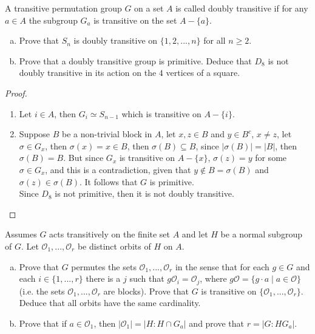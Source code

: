 \documentclass{article}
\newcommand{\orbit}{\mathcal{O}}
\newenvironment{problem}[2][Problem]{\begin{trivlist}
\item[\hskip \labelsep {\bfseries #1}\hskip \labelsep {\bfseries #2.}]}{\end{trivlist}}
\begin{document}
\begin{problem}{8}
     A transitive permutation group $G$ on a set $A$ is called doubly transitive if for any $a \in A$ the subgroup $G_a$ is transitive on the set $A-\{a\}$.
     \begin{enumerate}[(a)]
         \item Prove that $S_n$ is doubly transitive on $\{1, 2, ..., n\}$ for all $n \geq 2$. 
         \item Prove that a doubly transitive group is primitive. Deduce that $D_8$ is not doubly transitive in its action on the $4$ vertices of a square.
     \end{enumerate}
\end{problem}
\begin{proof}
\begin{enumerate}
    \item Let $i\in A$, then $G_i \simeq S_{n-1}$ which is transitive on $A-\{i\}$.
    \item Suppose $B$ be a non-trivial block in $A$, let $x, z\in B$ and $y \in B^c$, $x \neq z$, let $\sigma \in G_x$, then $\sigma(x)=x\in B$, then $\sigma(B)\subseteq B$, since $|\sigma (B)|=|B|$, then $\sigma(B)=B$. But since $G_x$ is transitive on $A-\{x\}$, $\sigma(z)=y$ for some $\sigma \in G_x$, and this is a contradiction, given that 
    $y \notin B=\sigma(B)$ and $\sigma(z) \in \sigma(B)$. It follows that $G$ is primitive.\\
    Since $D_8$ is not primitive, then it is not doubly transitive.
\end{enumerate}
\end{proof}
\begin{problem}{9}
    Assumes $G$ acts transitively on the finite set $A$ and let $H$ be a normal subgroup of $G$. Let $\orbit_1, ..., \orbit_r$ be distinct orbits of $H$ on $A$.
    \begin{enumerate}[(a)]
        \item Prove that $G$ permutes the sets $\orbit_1, ..., \orbit_r$ in the sense that for each $g \in G$ and each $i \in \{1, ..., r\}$ there is a $j$ such that $g \orbit_i=\orbit_j$, where $g \orbit =\{g \cdot a \mid a \in \orbit\}$ (i.e. the sets $\orbit_1, ..., \orbit_r$ are blocks). Prove that $G$ is transitive on $\{\orbit_1, ..., \orbit_r\}$. Deduce that all orbits have the same cardinality.
        \item Prove that if $a \in \orbit_1$, then $|\orbit_1|=|H : H\cap G_a|$ and prove that $r =|G: HG_a|$.
    \end{enumerate}
\end{problem}
\end{document}
